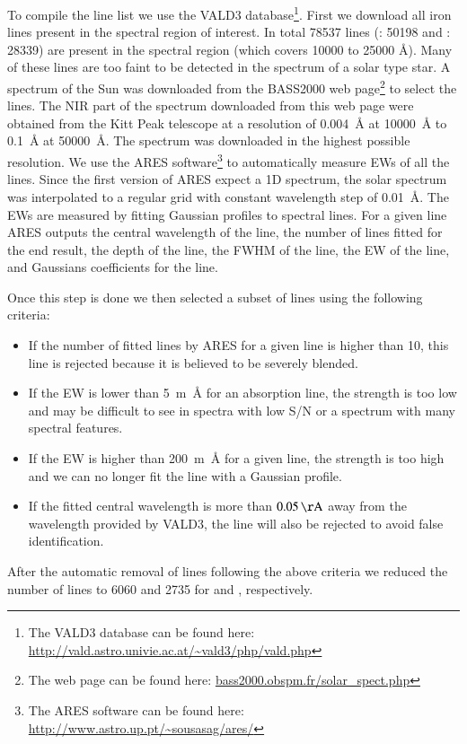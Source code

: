 \documentclass{aa}
\begin{document}
To compile the line list we use the VALD3
database\footnote{The VALD3 database can be found here:
\url{http://vald.astro.univie.ac.at/~vald3/php/vald.php}}. First we
download all iron lines present in the spectral region of interest.
In total 78537 lines (: 50198 and : 28339) are present in
the spectral region (which covers 10000 to 25000 \si{\angstrom}).
Many of these lines are too faint to be detected in the spectrum
of a solar type star. A spectrum of the Sun was downloaded from
the BASS2000 web page\footnote{The web page can be found here:
\url{bass2000.obspm.fr/solar_spect.php}} to select the lines.
The NIR part of the spectrum downloaded from this web page were obtained
from the Kitt Peak telescope at a resolution of \SI{0.004}{\angstrom} at
\SI{10000}{\angstrom} to \SI{0.1}{\angstrom} at \SI{50000}{\angstrom}.
The spectrum was downloaded in the highest possible resolution. We use
the ARES software\footnote{The ARES software can be found here:
\url{http://www.astro.up.pt/~sousasag/ares/}}\citep{Sousa2007,Sousa2015a}
to automatically measure EWs of all the lines. Since the first version
of ARES expect a 1D spectrum, the solar spectrum was interpolated to a
regular grid with constant wavelength step of \SI{0.01}{\angstrom}. The EWs
are measured by fitting Gaussian profiles to spectral lines. For a given
line ARES outputs the central wavelength of the line, the number of
lines fitted for the end result, the depth of the line, the FWHM of the
line, the EW of the line, and Gaussians coefficients for the line.

Once this step is done we then selected a subset of lines using the following
criteria:
\begin{itemize}
    \item If the number of fitted lines by ARES for a given line is higher than 10,
        this line is rejected because it is believed to be severely blended.
    \item If the EW is lower than \SI{5}{m\angstrom} for an absorption line, the strength
        is too low and may be difficult to see in spectra with low S/N or a
        spectrum with many spectral features.
    \item If the EW is higher than \SI{200}{m\angstrom} for a given line, the strength
        is too high and we can no longer fit the line with a Gaussian profile.
    \item If the fitted central wavelength is more than $\SI{0.05}{\AA}$ away
        from the wavelength provided by VALD3, the line will also be rejected to
        avoid false identification.
\end{itemize}
After the automatic removal of lines following the above criteria
we reduced the number of lines to 6060 and 2735 for  and ,
respectively.
\end{document}
